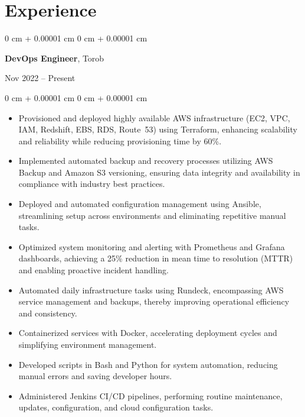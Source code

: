 \documentclass[10pt, letterpaper]{article}
\newenvironment{highlights}{
    \begin{itemize}[
        topsep=0.10 cm,
        parsep=0.10 cm,
        partopsep=0pt,
        itemsep=0pt,
        leftmargin=0 cm + 10pt
    ]
}{
    \end{itemize}
} %
\newenvironment{onecolentry}{
    \begin{adjustwidth}{
        0 cm + 0.00001 cm
    }{
        0 cm + 0.00001 cm
    }
}{
    \end{adjustwidth}
} %
\newenvironment{twocolentry}[2][]{
    \onecolentry
    \def\secondColumn{#2}
    \setcolumnwidth{\fill, 4.5 cm}
    \begin{paracol}{2}
}{
    \switchcolumn \raggedleft \secondColumn
    \end{paracol}
    \endonecolentry
} %
\begin{document}
            \section{Experience}
                \begin{twocolentry}{Nov 2022 -- Present}
                    \textbf{DevOps Engineer}, Torob
                \end{twocolentry}
                \vspace{0.10 cm}
                \begin{onecolentry}
                    \begin{highlights}
                        \item Provisioned and deployed highly available AWS infrastructure (EC2, VPC, IAM, Redshift, EBS, RDS, Route~53) using Terraform, enhancing scalability and reliability while reducing provisioning time by 60\%.
                        \item Implemented automated backup and recovery processes utilizing AWS Backup and Amazon S3 versioning, ensuring data integrity and availability in compliance with industry best practices.
                        \item Deployed and automated configuration management using Ansible, streamlining setup across environments and eliminating repetitive manual tasks.
                        \item Optimized system monitoring and alerting with Prometheus and Grafana dashboards, achieving a 25\% reduction in mean time to resolution (MTTR) and enabling proactive incident handling.
                        \item Automated daily infrastructure tasks using Rundeck, encompassing AWS service management and backups, thereby improving operational efficiency and consistency.
                        \item Containerized services with Docker, accelerating deployment cycles and simplifying environment management.
                        \item Developed scripts in Bash and Python for system automation, reducing manual errors and saving developer hours.
                        \item Administered Jenkins CI/CD pipelines, performing routine maintenance, updates, configuration, and cloud configuration tasks.
                    \end{highlights}
                \end{onecolentry}
\end{document}
